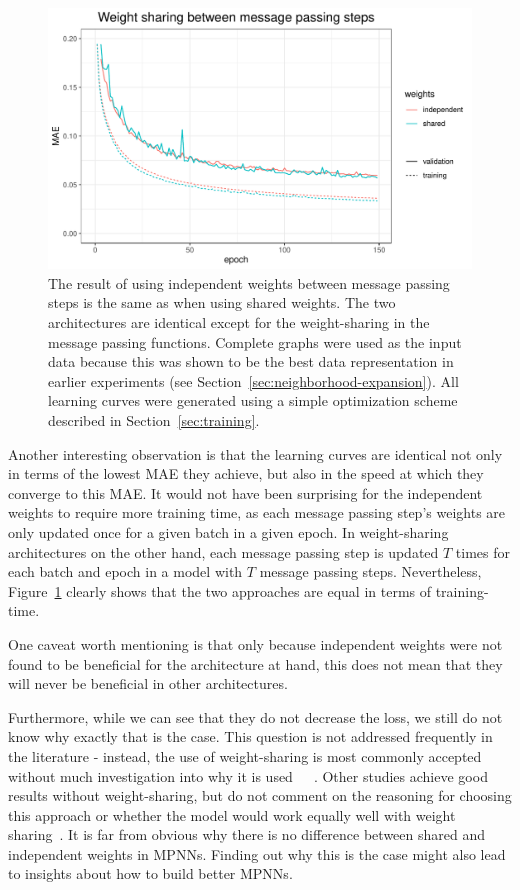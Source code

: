 \begin{figure}[H]
	\includegraphics[width=\linewidth]{figures/weight-sharing.pdf}
	\caption{The result of using independent weights between message passing steps is the same as when using shared weights. The two architectures are identical except for the weight-sharing in the message passing functions. Complete graphs were used as the input data because this was shown to be the best data representation in earlier experiments (see Section~\ref{sec:neighborhood-expansion}). All learning curves were generated using a simple optimization scheme described in Section~\ref{sec:training}.}
	\label{fig:weight-sharing}
\end{figure}


Another interesting observation is that the learning curves are identical not only in terms of the lowest MAE they achieve, but also in the speed at which they converge to this MAE. It would not have been surprising for the independent weights to require more training time, as each message passing step's weights are only updated once for a given batch in a given epoch. In weight-sharing architectures on the other hand, each message passing step is updated $T$ times for each batch and epoch in a model with $T$ message passing steps. Nevertheless, Figure~\ref{fig:weight-sharing} clearly shows that the two approaches are equal in terms of training-time.

One caveat worth mentioning is that only because independent weights were not found to be beneficial for the architecture at hand, this does not mean that they will never be beneficial in other architectures.

Furthermore, while we can see that they do not decrease the loss, we still do not know why exactly that is the case. This question is not addressed frequently in the literature - instead, the use of weight-sharing is most commonly accepted without much investigation into why it is used~\cite{Chen2019}~\cite{Schutt2017}~\cite{Klicpera2019}. Other studies achieve good results without weight-sharing, but do not comment on the reasoning for choosing this approach or whether the model would work equally well with weight sharing~\cite{Jørgensen2018}. It is far from obvious why there is no difference between shared and independent weights in MPNNs. Finding out why this is the case might also lead to insights about how to build better MPNNs.  

